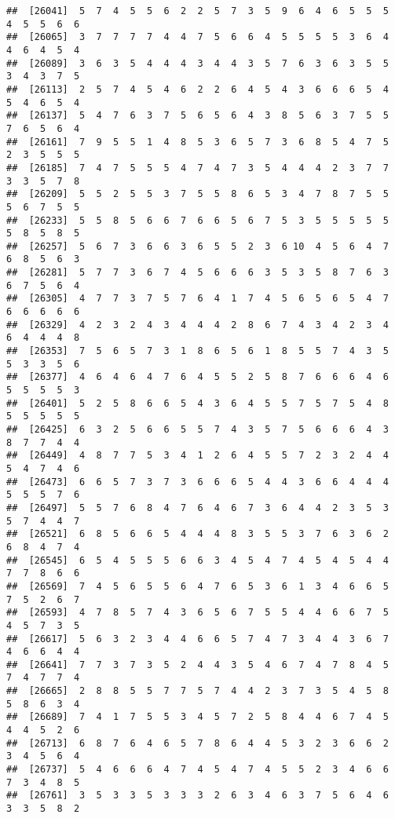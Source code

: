 \documentclass[
]{book}
\begin{document}
\begin{verbatim}
##  [26041]  5  7  4  5  5  6  2  2  5  7  3  5  9  6  4  6  5  5  5  4  5  5  6  6
##  [26065]  3  7  7  7  7  4  4  7  5  6  6  4  5  5  5  5  3  6  4  4  6  4  5  4
##  [26089]  3  6  3  5  4  4  4  3  4  4  3  5  7  6  3  6  3  5  5  3  4  3  7  5
##  [26113]  2  5  7  4  5  4  6  2  2  6  4  5  4  3  6  6  6  5  4  5  4  6  5  4
##  [26137]  5  4  7  6  3  7  5  6  5  6  4  3  8  5  6  3  7  5  5  7  6  5  6  4
##  [26161]  7  9  5  5  1  4  8  5  3  6  5  7  3  6  8  5  4  7  5  2  3  5  5  5
##  [26185]  7  4  7  5  5  5  4  7  4  7  3  5  4  4  4  2  3  7  7  3  3  5  7  8
##  [26209]  5  5  2  5  5  3  7  5  5  8  6  5  3  4  7  8  7  5  5  5  6  7  5  5
##  [26233]  5  5  8  5  6  6  7  6  6  5  6  7  5  3  5  5  5  5  5  5  8  5  8  5
##  [26257]  5  6  7  3  6  6  3  6  5  5  2  3  6 10  4  5  6  4  7  6  8  5  6  3
##  [26281]  5  7  7  3  6  7  4  5  6  6  6  3  5  3  5  8  7  6  3  6  7  5  6  4
##  [26305]  4  7  7  3  7  5  7  6  4  1  7  4  5  6  5  6  5  4  7  6  6  6  6  6
##  [26329]  4  2  3  2  4  3  4  4  4  2  8  6  7  4  3  4  2  3  4  6  4  4  4  8
##  [26353]  7  5  6  5  7  3  1  8  6  5  6  1  8  5  5  7  4  3  5  5  3  3  5  6
##  [26377]  4  6  4  6  4  7  6  4  5  5  2  5  8  7  6  6  6  4  6  5  5  5  5  3
##  [26401]  5  2  5  8  6  6  5  4  3  6  4  5  5  7  5  7  5  4  8  5  5  5  5  5
##  [26425]  6  3  2  5  6  6  5  5  7  4  3  5  7  5  6  6  6  4  3  8  7  7  4  4
##  [26449]  4  8  7  7  5  3  4  1  2  6  4  5  5  7  2  3  2  4  4  5  4  7  4  6
##  [26473]  6  6  5  7  3  7  3  6  6  6  5  4  4  3  6  6  4  4  4  5  5  5  7  6
##  [26497]  5  5  7  6  8  4  7  6  4  6  7  3  6  4  4  2  3  5  3  5  7  4  4  7
##  [26521]  6  8  5  6  6  5  4  4  4  8  3  5  5  3  7  6  3  6  2  6  8  4  7  4
##  [26545]  6  5  4  5  5  5  6  6  3  4  5  4  7  4  5  4  5  4  4  7  7  8  6  6
##  [26569]  7  4  5  6  5  5  6  4  7  6  5  3  6  1  3  4  6  6  5  7  5  2  6  7
##  [26593]  4  7  8  5  7  4  3  6  5  6  7  5  5  4  4  6  6  7  5  4  5  7  3  5
##  [26617]  5  6  3  2  3  4  4  6  6  5  7  4  7  3  4  4  3  6  7  4  6  6  4  4
##  [26641]  7  7  3  7  3  5  2  4  4  3  5  4  6  7  4  7  8  4  5  7  4  7  7  4
##  [26665]  2  8  8  5  5  7  7  5  7  4  4  2  3  7  3  5  4  5  8  5  8  6  3  4
##  [26689]  7  4  1  7  5  5  3  4  5  7  2  5  8  4  4  6  7  4  5  4  4  5  2  6
##  [26713]  6  8  7  6  4  6  5  7  8  6  4  4  5  3  2  3  6  6  2  3  4  5  6  4
##  [26737]  5  4  6  6  6  4  7  4  5  4  7  4  5  5  2  3  4  6  6  7  3  4  8  5
##  [26761]  3  5  3  3  5  3  3  3  2  6  3  4  6  3  7  5  6  4  6  3  3  5  8  2

\end{verbatim}
\end{document}
